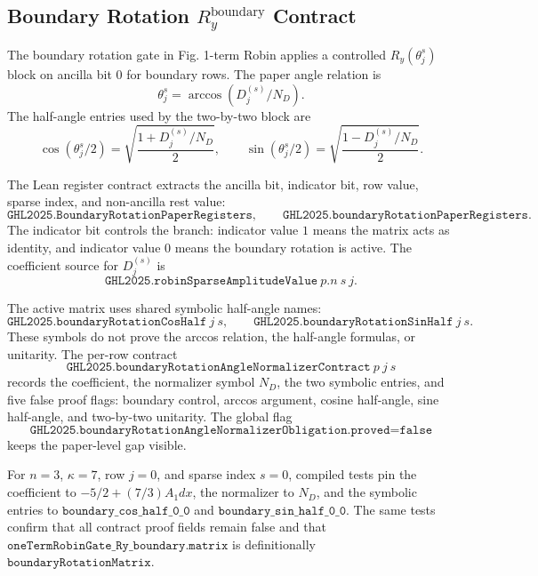 \subsection{Boundary Rotation $R_y^{\mathrm{boundary}}$ Contract}

The boundary rotation gate in Fig. 1-term Robin applies a controlled
\(R_y(\theta_j^s)\) block on ancilla bit 0 for boundary rows.  The paper angle
relation is
\[
  \theta_j^s = \arccos(D_j^{(s)}/N_D).
\]
The half-angle entries used by the two-by-two block are
\[
  \cos(\theta_j^s/2)
  =
  \sqrt{\frac{1 + D_j^{(s)}/N_D}{2}},
  \qquad
  \sin(\theta_j^s/2)
  =
  \sqrt{\frac{1 - D_j^{(s)}/N_D}{2}}.
\]

The Lean register contract extracts the ancilla bit, indicator bit, row value,
sparse index, and non-ancilla rest value:
\[
  \texttt{GHL2025.BoundaryRotationPaperRegisters},
  \qquad
  \texttt{GHL2025.boundaryRotationPaperRegisters}.
\]
The indicator bit controls the branch: indicator value \(1\) means the matrix
acts as identity, and indicator value \(0\) means the boundary rotation is
active.  The coefficient source for \(D_j^{(s)}\) is
\[
  \texttt{GHL2025.robinSparseAmplitudeValue}\ p.n\ s\ j.
\]

The active matrix uses shared symbolic half-angle names:
\[
  \texttt{GHL2025.boundaryRotationCosHalf}\ j\ s,
  \qquad
  \texttt{GHL2025.boundaryRotationSinHalf}\ j\ s.
\]
These symbols do not prove the arccos relation, the half-angle formulas, or
unitarity.  The per-row contract
\[
  \texttt{GHL2025.boundaryRotationAngleNormalizerContract}\ p\ j\ s
\]
records the coefficient, the normalizer symbol \(N_D\), the two symbolic
entries, and five false proof flags: boundary control, arccos argument,
cosine half-angle, sine half-angle, and two-by-two unitarity.  The global flag
\[
  \texttt{GHL2025.boundaryRotationAngleNormalizerObligation.proved}
  =
  \texttt{false}
\]
keeps the paper-level gap visible.

For \(n=3\), \(\kappa=7\), row \(j=0\), and sparse index \(s=0\), compiled
tests pin the coefficient to \(-5/2+(7/3)A_1dx\), the normalizer to \(N_D\),
and the symbolic entries to \(\texttt{boundary\_cos\_half\_0\_0}\) and
\(\texttt{boundary\_sin\_half\_0\_0}\).  The same tests confirm that all
contract proof fields remain false and that
\(\texttt{oneTermRobinGate\_Ry\_boundary.matrix}\) is definitionally
\(\texttt{boundaryRotationMatrix}\).

